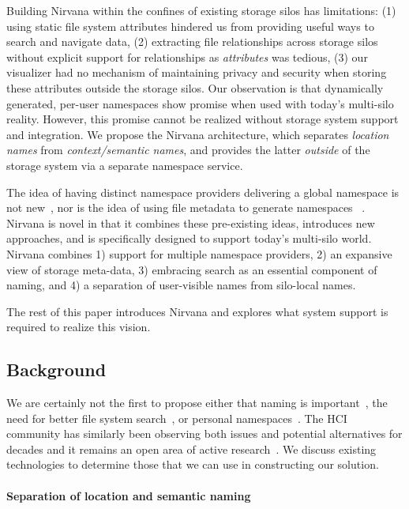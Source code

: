 Building Nirvana within the confines of existing storage silos has limitations:
(1) using static file system attributes hindered us from providing useful ways to search and navigate data,
(2) extracting file relationships across storage silos without explicit support for relationships as \textit{attributes} was tedious,
(3) our visualizer had no mechanism of maintaining privacy and security when storing these attributes outside the storage silos.
Our observation is that dynamically generated, per-user namespaces show promise when used with today's multi-silo reality.
However, this promise cannot be realized without storage system support and integration.
We propose the Nirvana architecture, which separates \textit{location names} from \textit{context/semantic names}, and provides
the latter \textit{outside} of the storage system via a separate namespace service.

The idea of having distinct namespace providers delivering a global namespace is not new~\cite{howard1988scale,kazar1990decorum},
nor is the idea of using file metadata to generate namespaces ~\cite{gifford1991semantic}.
Nirvana is novel in that it combines these pre-existing ideas, introduces new approaches, and is specifically designed to support today's multi-silo world.
Nirvana combines 1) support for multiple namespace providers,
2) an expansive view of storage meta-data,
3) embracing search as an essential component of naming, and
4) a separation of user-visible names from silo-local names.

The rest of this paper introduces Nirvana and explores what system support is required to realize this vision.

\subsection{Background}
\label{hotos21:background}

We are certainly not the first to propose either that naming is important~\cite{pike-naming},
the need for better file system search~\cite{gifford1991semantic,mogul1986representing,Seltzer2009},
or personal namespaces~\cite{10.1145/155848.155861}.
The HCI community has similarly been observing both issues and potential alternatives for
decades and it remains an open area of active research~\cite{malone1983how,bergman2019factors,CHS:Medium:2019,vitale2020personal}.
We discuss existing technologies to determine those that we can use in constructing our solution.

\paragraph{Separation of location and semantic naming}

